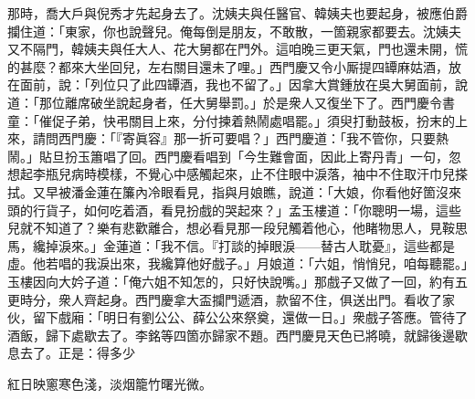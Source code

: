 那時，喬大戶與倪秀才先起身去了。沈姨夫與任醫官、韓姨夫也要起身，被應伯爵攔住道：「東家，你也說聲兒。俺每倒是朋友，不敢散，一箇親家都要去。沈姨夫又不隔門，韓姨夫與任大人、花大舅都在門外。這咱晚三更天氣，門也還未開，慌的甚麼？{}都來大坐回兒，左右關目還未了哩。」西門慶又令小厮提四罈麻姑酒，放在面前，說：「列位只了此四罈酒，我也不留了。」因拿大賞鍾放在吳大舅面前，說道：「那位離席破坐說起身者，任大舅舉罰。」於是衆人又復坐下了。西門慶令書童：「催促子弟，快弔關目上來，分付揀着熱鬧處唱罷。」須臾打動鼓板，扮末的上來，請問西門慶：「『寄眞容』那一折可要唱？」西門慶道：「我不管你，只要熱鬧。」貼旦扮玉簫唱了回。西門慶看唱到「今生難會面，因此上寄丹青」一句，忽想起李瓶兒病時模樣，不覺心中感觸起來，止不住眼中淚落，袖中不住取汗巾兒搽拭。{}又早被潘金蓮在簾內冷眼看見，{}指與月娘瞧，說道：「大娘，你看他好箇沒來頭的行貨子，如何吃着酒，看見扮戲的哭起來？」孟玉樓道：「你聰明一場，這些兒就不知道了？樂有悲歡離合，想必看見那一段兒觸着他心，他睹物思人，見鞍思馬，纔掉淚來。」金蓮道：「我不信。『打談的掉眼淚——替古人耽憂』，這些都是虛。他若唱的我淚出來，我纔算他好戲子。」{}月娘道：「六姐，悄悄兒，咱每聽罷。」玉樓因向大妗子道：「俺六姐不知怎的，只好快說嘴。」那戲子又做了一回，約有五更時分，衆人齊起身。西門慶拿大盃攔門遞酒，款留不住，俱送出門。看收了家伙，留下戲廂：「明日有劉公公、薛公公來祭奠，還做一日。」衆戲子答應。管待了酒飯，歸下處歇去了。李銘等四箇亦歸家不題。西門慶見天色已將曉，就歸後邊歇息去了。正是：得多少

\begin{myquote} 
紅日映窻寒色淺，淡烟籠竹曙光微。
\end{myquote} 

